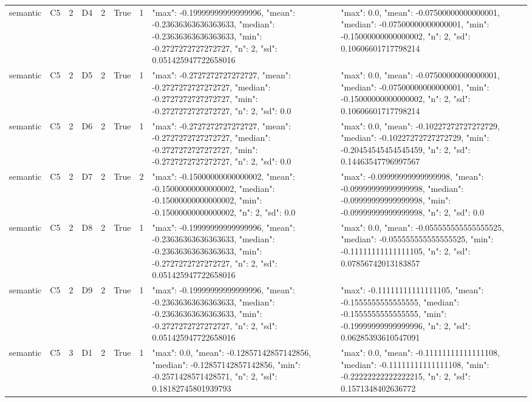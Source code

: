 \begin{tabular}{lllllllll}
semantic & C5 & 2 & D4 & 2 & True & 1 & {"max": -0.19999999999999996, "mean": -0.23636363636363633, "median": -0.23636363636363633, "min": -0.2727272727272727, "n": 2, "sd": 0.051425947722658016} & {"max": 0.0, "mean": -0.07500000000000001, "median": -0.07500000000000001, "min": -0.15000000000000002, "n": 2, "sd": 0.10606601717798214} \\
semantic & C5 & 2 & D5 & 2 & True & 1 & {"max": -0.2727272727272727, "mean": -0.2727272727272727, "median": -0.2727272727272727, "min": -0.2727272727272727, "n": 2, "sd": 0.0} & {"max": 0.0, "mean": -0.07500000000000001, "median": -0.07500000000000001, "min": -0.15000000000000002, "n": 2, "sd": 0.10606601717798214} \\
semantic & C5 & 2 & D6 & 2 & True & 1 & {"max": -0.2727272727272727, "mean": -0.2727272727272727, "median": -0.2727272727272727, "min": -0.2727272727272727, "n": 2, "sd": 0.0} & {"max": 0.0, "mean": -0.10227272727272729, "median": -0.10227272727272729, "min": -0.20454545454545459, "n": 2, "sd": 0.14463547796997567} \\
semantic & C5 & 2 & D7 & 2 & True & 2 & {"max": -0.15000000000000002, "mean": -0.15000000000000002, "median": -0.15000000000000002, "min": -0.15000000000000002, "n": 2, "sd": 0.0} & {"max": -0.09999999999999998, "mean": -0.09999999999999998, "median": -0.09999999999999998, "min": -0.09999999999999998, "n": 2, "sd": 0.0} \\
semantic & C5 & 2 & D8 & 2 & True & 1 & {"max": -0.19999999999999996, "mean": -0.23636363636363633, "median": -0.23636363636363633, "min": -0.2727272727272727, "n": 2, "sd": 0.051425947722658016} & {"max": 0.0, "mean": -0.055555555555555525, "median": -0.055555555555555525, "min": -0.11111111111111105, "n": 2, "sd": 0.07856742013183857} \\
semantic & C5 & 2 & D9 & 2 & True & 1 & {"max": -0.19999999999999996, "mean": -0.23636363636363633, "median": -0.23636363636363633, "min": -0.2727272727272727, "n": 2, "sd": 0.051425947722658016} & {"max": -0.11111111111111105, "mean": -0.1555555555555555, "median": -0.1555555555555555, "min": -0.19999999999999996, "n": 2, "sd": 0.06285393610547091} \\
semantic & C5 & 3 & D1 & 2 & True & 1 & {"max": 0.0, "mean": -0.12857142857142856, "median": -0.12857142857142856, "min": -0.2571428571428571, "n": 2, "sd": 0.18182745801939793} & {"max": 0.0, "mean": -0.11111111111111108, "median": -0.11111111111111108, "min": -0.22222222222222215, "n": 2, "sd": 0.1571348402636772} \\

\end{tabular}
